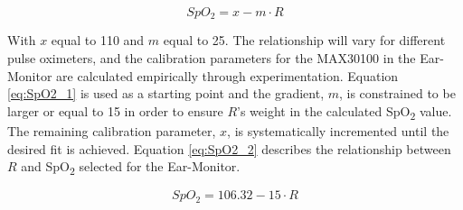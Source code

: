 \begin{equation}
\label{eq:SpO2_1}
SpO_2=x-m\cdot R
\end{equation}

With $x$ equal to 110 and $m$ equal to 25. The relationship will vary for different pulse oximeters, and the calibration parameters for the MAX30100 in the Ear-Monitor are calculated empirically through experimentation. Equation \ref{eq:SpO2_1} is used as a starting point and the gradient, $m$, is constrained to be larger or equal to 15 in order to ensure $R$'s weight in the calculated SpO\textsubscript{2} value. The remaining calibration parameter, $x$, is systematically incremented until the desired fit is achieved. Equation \ref{eq:SpO2_2} describes the relationship between $R$ and SpO\textsubscript{2} selected for the Ear-Monitor.

\begin{equation}
\label{eq:SpO2_2}
SpO_2=106.32-15\cdot R
\end{equation}




